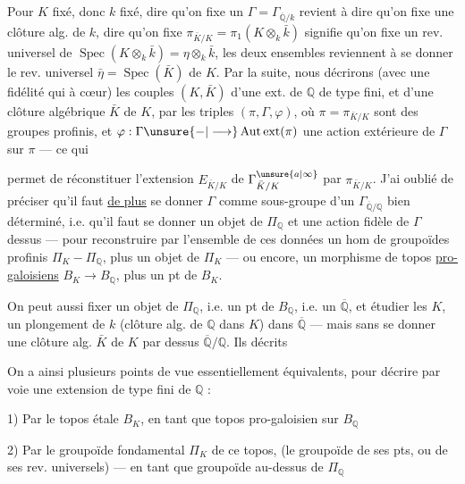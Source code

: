 Pour $K$ fixé, donc $k$ fixé, dire qu'on fixe un $\Gamma=\Gamma_{\overline{\mathbb Q}/k}$ revient à dire qu'on fixe une clôture alg. de $k$, dire qu'on fixe  $\pi_{\bar K/K}=\pi_1(K\otimes_k\bar k)$ signifie  qu'on fixe un rev. universel de $\operatorname{Spec}(K\otimes_k\bar k)=\eta\otimes_k\bar k$,  les deux ensembles reviennent à se donner le rev. universel  $\bar\eta=\operatorname{Spec}(\bar K)$ de $K$. Par la suite, nous décrirons (avec une fidélité qui  à cœur) les couples $(K,\bar K)$ d'une ext. de $\mathbb Q$ de type fini, et d'une clôture algébrique $\bar K$ de $K$, par les triples $(\pi,\Gamma,\varphi)$, où $\pi=\pi_{\bar K/K}$  sont des groupes profinis, et $\varphi:\Gamma\unsure{-|\longrightarrow}\operatorname{Aut\,ext}(\pi)$ une action extérieure de $\Gamma$ sur $\pi$ --- ce qui

permet de réconstituer l'extension $E_{\bar K/K}$ de $\Gamma^{\unsure{a|\infty}}_{\bar K/K}$ par $\pi_{\bar K/K}$. J'ai oublié de préciser qu'il faut \uline{de plus} se donner $\Gamma$ comme sous-groupe d'un $\Gamma_{\overline{\mathbb Q}/\mathbb Q}$ bien déterminé, i.e. qu'il faut se donner un objet de $\Pi_{\mathbb Q}$ et une action fidèle de $\Gamma$ dessus --- pour reconstruire par l'ensemble de ces données un hom de groupoïdes profinis $\Pi_K-\Pi_{\mathbb Q}$, plus un objet de $\Pi_K$ --- ou encore, un morphisme de topos \uline{pro-galoisiens} $B_K\longrightarrow B_{\mathbb Q}$, plus un pt de $B_K$.

On peut aussi fixer un objet de $\Pi_{\mathbb Q}$, i.e. un pt de $B_{\mathbb Q}$, i.e. un $\overline{\mathbb Q}$, et étudier les $K$,  un plongement de $k$ (clôture alg. de $\mathbb Q$ dans $K$) dans $\overline{\mathbb Q}$ ---  mais sans se donner une clôture alg. $\bar K$ de $K$ par dessus $\overline{\mathbb Q}/\mathbb Q$. Ils  décrits

On a ainsi plusieurs points de vue essentiellement équivalents, pour décrire par voie  une extension  de type fini de $\mathbb Q$ :

1) Par le topos étale $B_K$, en tant que topos pro-galoisien sur $B_{\mathbb Q}$

2) Par le groupoïde fondamental $\Pi_K$ de ce topos, (le groupoïde de ses pts, ou de ses rev. universels) --- en tant que groupoïde au-dessus de $\Pi_{\mathbb Q}$

